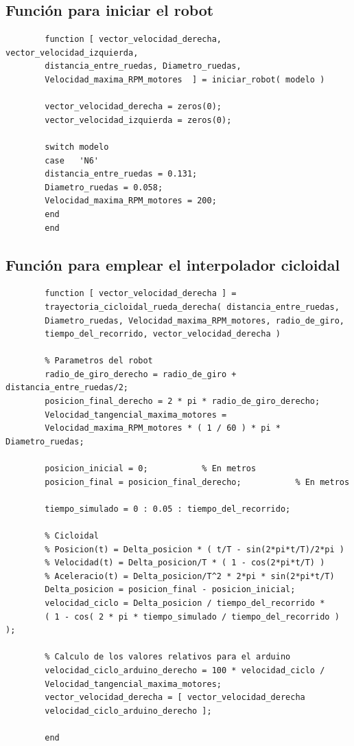 \documentclass[12pt,a4paper]{article}
\begin{document}
    	\subsection{Función para iniciar el robot}
        
        \begin{verbatim}
        function [ vector_velocidad_derecha, vector_velocidad_izquierda,
        distancia_entre_ruedas, Diametro_ruedas,
        Velocidad_maxima_RPM_motores  ] = iniciar_robot( modelo )

        vector_velocidad_derecha = zeros(0);
        vector_velocidad_izquierda = zeros(0);

        switch modelo
        case   'N6'
        distancia_entre_ruedas = 0.131;
        Diametro_ruedas = 0.058;
        Velocidad_maxima_RPM_motores = 200;
        end
        end
		\end{verbatim}
        
        
        \subsection{Función para emplear el interpolador cicloidal}
        
        \begin{verbatim}
        function [ vector_velocidad_derecha ] = 
        trayectoria_cicloidal_rueda_derecha( distancia_entre_ruedas,
        Diametro_ruedas, Velocidad_maxima_RPM_motores, radio_de_giro,
        tiempo_del_recorrido, vector_velocidad_derecha )

        % Parametros del robot
        radio_de_giro_derecho = radio_de_giro + distancia_entre_ruedas/2;
        posicion_final_derecho = 2 * pi * radio_de_giro_derecho;
        Velocidad_tangencial_maxima_motores =
        Velocidad_maxima_RPM_motores * ( 1 / 60 ) * pi * Diametro_ruedas;

        posicion_inicial = 0;           % En metros
        posicion_final = posicion_final_derecho;           % En metros

        tiempo_simulado = 0 : 0.05 : tiempo_del_recorrido;

        % Cicloidal
        % Posicion(t) = Delta_posicion * ( t/T - sin(2*pi*t/T)/2*pi )
        % Velocidad(t) = Delta_posicion/T * ( 1 - cos(2*pi*t/T) )
        % Aceleracio(t) = Delta_posicion/T^2 * 2*pi * sin(2*pi*t/T)
        Delta_posicion = posicion_final - posicion_inicial;
        velocidad_ciclo = Delta_posicion / tiempo_del_recorrido *
        ( 1 - cos( 2 * pi * tiempo_simulado / tiempo_del_recorrido ) );

        % Calculo de los valores relativos para el arduino
        velocidad_ciclo_arduino_derecho = 100 * velocidad_ciclo /
        Velocidad_tangencial_maxima_motores;
        vector_velocidad_derecha = [ vector_velocidad_derecha
        velocidad_ciclo_arduino_derecho ];

        end
		\end{verbatim}
        
\end{document}
